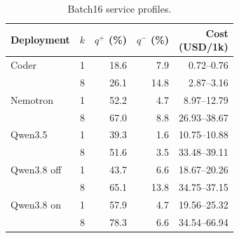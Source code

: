 \begin{table}[t]
\caption{Batch16 service profiles.}
\label{tab:retail-profiles}
\centering\small
\begin{tabular}{@{}lcrrr@{}}
\toprule
Deployment & $k$ & $q^+$ (\%) & $q^-$ (\%) & \shortstack{Cost\\(USD/1k)} \\
\midrule
Coder & 1 & 18.6 & 7.9 & 0.72--0.76 \\
 & 8 & 26.1 & 14.8 & 2.87--3.16 \\
Nemotron & 1 & 52.2 & 4.7 & 8.97--12.79 \\
 & 8 & 67.0 & 8.8 & 26.93--38.67 \\
Qwen3.5 & 1 & 39.3 & 1.6 & 10.75--10.88 \\
 & 8 & 51.6 & 3.5 & 33.48--39.11 \\
Qwen3.8 off & 1 & 43.7 & 6.6 & 18.67--20.26 \\
 & 8 & 65.1 & 13.8 & 34.75--37.15 \\
Qwen3.8 on & 1 & 57.9 & 4.7 & 19.56--25.32 \\
 & 8 & 78.3 & 6.6 & 34.54--66.94 \\
\bottomrule
\end{tabular}
\end{table}
